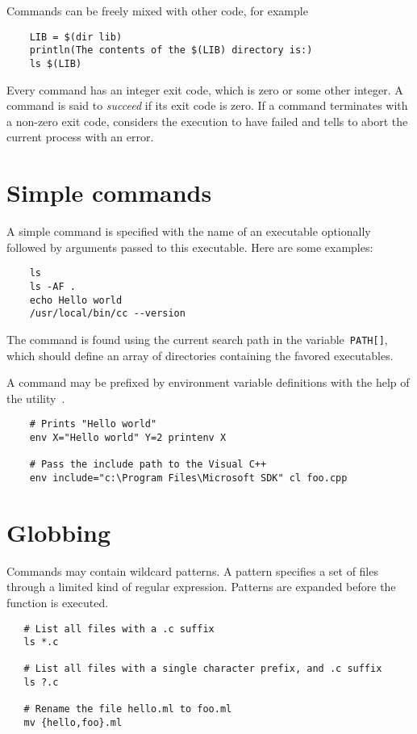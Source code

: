 Commands can be freely mixed with other code, for example

\begin{verbatim}
    LIB = $(dir lib)
    println(The contents of the $(LIB) directory is:)
    ls $(LIB)
\end{verbatim}

Every command has an integer exit code, which is zero or some other integer.  A command is said to
\emph{succeed} if its exit code is zero.  If a command terminates with a non-zero exit code,
 considers the execution to have failed and tells \OMake{} to abort the current process
with an error.

\section{Simple commands}

A simple command is specified with the name of an executable optionally followed by arguments passed
to this executable.  Here are some examples:

\begin{verbatim}
    ls
    ls -AF .
    echo Hello world
    /usr/local/bin/cc --version
\end{verbatim}

The command is found using the current search path in the variable~\verb+PATH[]+, which should
define an array of directories containing the favored executables.

A command may be prefixed by environment variable definitions with the help of the
utility~.

\begin{verbatim}
    # Prints "Hello world"
    env X="Hello world" Y=2 printenv X

    # Pass the include path to the Visual C++
    env include="c:\Program Files\Microsoft SDK" cl foo.cpp
\end{verbatim}

\section{Globbing}

Commands may contain wildcard patterns.  A pattern specifies a set of files through a limited kind
of regular expression.  Patterns are expanded before the function is executed.

\begin{verbatim}
   # List all files with a .c suffix
   ls *.c

   # List all files with a single character prefix, and .c suffix
   ls ?.c

   # Rename the file hello.ml to foo.ml
   mv {hello,foo}.ml
\end{verbatim}

